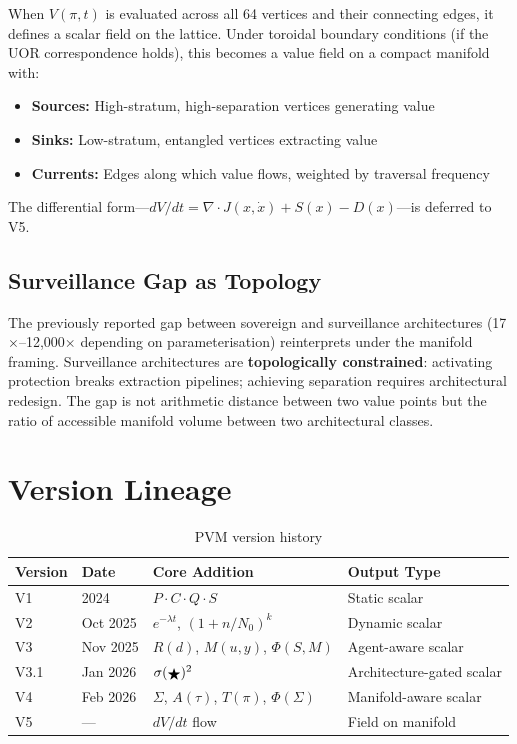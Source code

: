 \documentclass[11pt,a4paper]{article}
\begin{document}
When $V(\pi, t)$ is evaluated across all 64 vertices and their connecting edges, it defines a scalar field on the lattice. Under toroidal boundary conditions (if the UOR correspondence holds), this becomes a value field on a compact manifold with:

\begin{itemize}[nosep]
    \item \textbf{Sources:} High-stratum, high-separation vertices generating value
    \item \textbf{Sinks:} Low-stratum, entangled vertices extracting value
    \item \textbf{Currents:} Edges along which value flows, weighted by traversal frequency
\end{itemize}

\noindent The differential form---$dV/dt = \nabla \cdot J(x, \dot{x}) + S(x) - D(x)$---is deferred to V5.

\subsection{Surveillance Gap as Topology}

The previously reported gap between sovereign and surveillance architectures (17$\times$--12{,}000$\times$ depending on parameterisation) reinterprets under the manifold framing. Surveillance architectures are \textbf{topologically constrained}: activating protection breaks extraction pipelines; achieving separation requires architectural redesign. The gap is not arithmetic distance between two value points but the ratio of accessible manifold volume between two architectural classes.

\section{Version Lineage}

\begin{table}[h]
\centering
\caption{PVM version history}
\begin{tabular}{@{}llll@{}}
\toprule
\textbf{Version} & \textbf{Date} & \textbf{Core Addition} & \textbf{Output Type} \\
\midrule
V1 & 2024 & $P \cdot C \cdot Q \cdot S$ & Static scalar \\
V2 & Oct 2025 & $e^{-\lambda t}$, $(1+n/N_0)^k$ & Dynamic scalar \\
V3 & Nov 2025 & $R(d)$, $M(u,y)$, $\Phi(S,M)$ & Agent-aware scalar \\
V3.1 & Jan 2026 & $\sigma(\text{\raisebox{-0.1em}{$\bigstar$}})^2$ & Architecture-gated scalar \\
V4 & Feb 2026 & $\Sigma$, $A(\tau)$, $T(\pi)$, $\Phi(\Sigma)$ & Manifold-aware scalar \\
V5 & --- & $dV/dt$ flow & Field on manifold \\
\bottomrule
\end{tabular}
\end{table}
\end{document}
